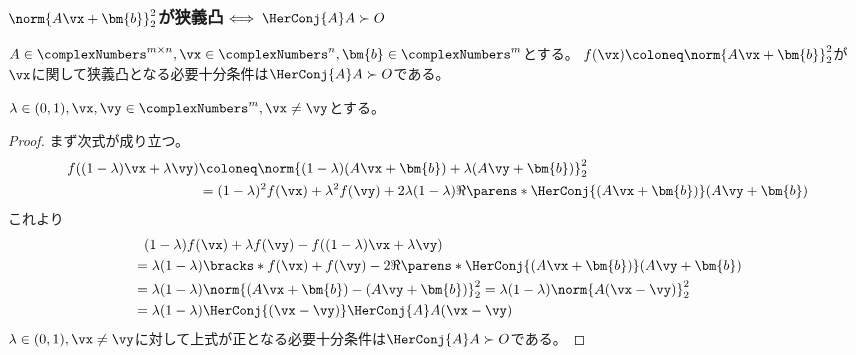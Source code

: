             \subsubsection{\texorpdfstring{$\norm{A\vx+\bm{b}}_2^2$}{||Ax+b||\string^2}が狭義凸\texorpdfstring{$\iff \HerConj{A}A\succ O$}{⇔ A*Aが正定}}
                \begin{shadebox}
                    $A \in \complexNumbers^{m\times n}, \vx \in \complexNumbers^n, \bm{b} \in \complexNumbers^m$とする。
                    $f(\vx) \coloneq \norm{A\vx+\bm{b}}_2^2$が$\vx$に関して狭義凸となる必要十分条件は$\HerConj{A}A\succ O$である。
                \end{shadebox}
                $\lambda \in (0,1), \vx,\vy \in \complexNumbers^m, \vx\neq\vy$とする。
                \begin{proof}
                    まず次式が成り立つ。
                    \begin{align*}
                        f((1-\lambda)\vx + \lambda\vy) &\coloneq \norm{(1-\lambda)(A\vx+\bm{b}) + \lambda(A\vy+\bm{b})}_2^2 \\
                        &= (1-\lambda)^2 f(\vx) + \lambda^2 f(\vy) + 2\lambda(1-\lambda)\Re\parens*{\HerConj{(A\vx+\bm{b})}(A\vy+\bm{b})}
                    \end{align*}
                    これより
                    \begin{align*}
                        &\phantom{=} (1-\lambda)f(\vx) + \lambda f(\vy) - f((1-\lambda)\vx + \lambda\vy) \\
                        &= \lambda(1-\lambda)\bracks*{f(\vx) + f(\vy) - 2\Re\parens*{\HerConj{(A\vx+\bm{b})}(A\vy+\bm{b})}} \\
                        &= \lambda(1-\lambda)\norm{(A\vx+\bm{b}) - (A\vy+\bm{b})}_2^2 = \lambda(1-\lambda)\norm{A(\vx-\vy)}_2^2 \\
                        &= \lambda(1-\lambda)\HerConj{(\vx-\vy)}\HerConj{A}A(\vx-\vy)
                    \end{align*}
                    $\lambda \in (0,1),\vx\neq\vy$に対して上式が正となる必要十分条件は$\HerConj{A}A\succ O$である。
                \end{proof}
